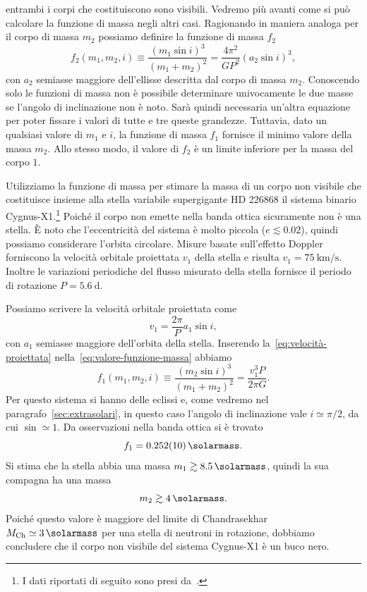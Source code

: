 entrambi i corpi che costituiscono sono visibili. Vedremo più avanti come si può
calcolare la funzione di massa negli altri casi. Ragionando in maniera analoga
per il corpo di massa $m_2$ possiamo definire la funzione di massa $f_2$
\begin{equation}
  f_2(m_1,m_2,i) \equiv \frac{(m_1\sin i)^3}{(m_1 + m_2)^2} =
  \frac{4\pi^2}{GP^2}(a_2\sin i)^3,
\end{equation}
con $a_2$ semiasse maggiore dell'ellisse descritta dal corpo di massa
$m_2$. Conoscendo solo le funzioni di massa non è possibile determinare
univocamente le due masse se l'angolo di inclinazione non è noto. Sarà quindi
necessaria un'altra equazione per poter fissare i valori di tutte e tre queste
grandezze. Tuttavia, dato un qualsiasi valore di $m_1$ e $i$, la funzione di
massa $f_1$ fornisce il minimo valore della massa $m_2$. Allo stesso modo, il
valore di $f_2$ è un limite inferiore per la massa del corpo $1$.

Utilizziamo la funzione di massa per stimare la massa di un corpo non visibile
che costituisce insieme alla stella variabile supergigante HD 226868 il sistema
binario
Cygnus-X1.\footnote{I dati riportati di seguito sono presi
  da~\textcite{melia:astrophysics}.} Poiché il corpo non emette nella banda
ottica sicuramente non è una stella. È noto che l'eccentricità del sistema è
molto piccola ($e \lesssim 0.02$), quindi possiamo considerare l'orbita
circolare. Misure basate sull'effetto Doppler forniscono la velocità orbitale
proiettata $v_1$ della stella e risulta $v_1 =
\SI{75}{\kilo\metre\per\second}$. Inoltre le variazioni periodiche del flusso
misurato della stella fornisce il periodo di rotazione $P = \SI{5.6}{\day}$.

Possiamo scrivere la velocità orbitale proiettata come
\begin{equation}
  \label{eq:velocità-proiettata}
  v_1 = \frac{2\pi}{P}a_1\sin i,
\end{equation}
con $a_1$ semiasse maggiore dell'orbita della stella. Inserendo
la~\eqref{eq:velocità-proiettata} nella~\eqref{eq:valore-funzione-massa} abbiamo
\begin{equation}
  f_1(m_1,m_2,i) \equiv \frac{(m_2\sin i)^3}{(m_1 + m_2)^2} = \frac{v_1^3P}{2\pi
    G}.
\end{equation}
Per questo sistema si hanno delle eclissi e, come vedremo nel
paragrafo~\ref{sec:extrasolari}, in questo caso l'angolo di inclinazione vale
$i \simeq \pi/2$, da cui $\sin \simeq 1$. Da osservazioni nella banda ottica si
è trovato
\begin{equation}
  f_1 = \SI{0.252(10)}{\solarmass}.
\end{equation}
Si stima che la stella abbia una massa $m_1 \gtrsim \SI{8.5}{\solarmass}$,
quindi la sua compagna ha una massa
\begin{equation}
  m_2 \gtrsim \SI{4}{\solarmass}.
\end{equation}
Poiché questo valore è maggiore del limite di Chandrasekhar %
$M_\textup{Ch} \simeq \SI{3}{\solarmass}$ per una stella di neutroni in
rotazione, dobbiamo concludere che il corpo non visibile del sistema Cygnus-X1 è
un buco nero.

